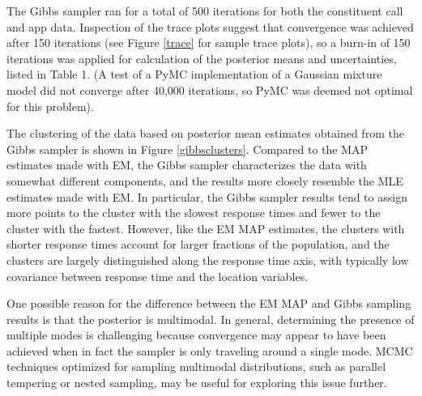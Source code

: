 \documentclass[twoside]{article}
\theoremstyle{theorem}
\theoremstyle{theorem}
\theoremstyle{theorem}
\theoremstyle{lemma}
\theoremstyle{definition}
\theoremstyle{example}
\begin{document}
The Gibbs sampler ran for a total of 500 iterations for both the constituent call and app data. Inspection of the trace plots suggest that convergence was achieved after 150 iterations (see Figure \ref{trace} for sample trace plots), so a burn-in of 150 iterations was applied for calculation of the posterior means and uncertainties, listed in Table 1. (A test of a PyMC implementation of a Gaussian mixture model did not converge after 40,000 iterations, so PyMC was deemed not optimal for this problem). 

The clustering of the data based on posterior mean estimates obtained from the Gibbs sampler is shown in Figure \ref{gibbsclusters}. Compared to the MAP estimates made with EM, the Gibbs sampler characterizes the data with somewhat different components, and the results more closely resemble the MLE estimates made with EM. In particular, the Gibbs sampler results tend to assign more points to the cluster with the slowest response times and fewer to the cluster with the fastest. However, like the EM MAP estimates, the clusters with shorter response times account for larger fractions of the population, and the clusters are largely distinguished along the response time axis, with typically low covariance between response time and the location variables. 

One possible reason for the difference between the EM MAP and Gibbs sampling results is that the posterior is multimodal. In general, determining the presence of multiple modes is challenging because convergence may appear to have been achieved when in fact the sampler is only traveling around a single mode. MCMC techniques optimized for sampling multimodal distributions, such as parallel tempering or nested sampling, may be useful for exploring this issue further. 
\end{document}
